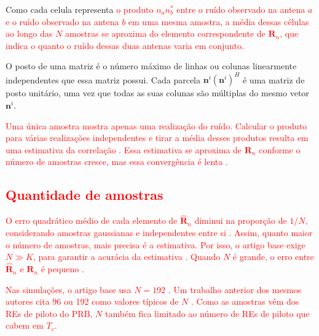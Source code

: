 Como cada celula representa
\textcolor{red}{o produto $n_a n_b^*$ entre o ruído observado na antena $a$ e o ruído observado na antena $b$ em uma mesma amostra, a média dessas células ao longo das $N$ amostras se aproxima do elemento correspondente de $\mathbf{R}_n$, que indica o quanto o ruído dessas duas antenas varia em conjunto.}

O posto de uma matriz é o número máximo de linhas ou colunas linearmente independentes que essa matriz possui.  Cada parcela $\mathbf{n}^i(\mathbf{n}^i)^H$ é uma matriz de posto unitário, uma vez que todas as suas colunas são múltiplas do mesmo vetor $\mathbf{n}^i$.

\textcolor{red}{Uma única amostra mostra apenas uma realização do ruído. Calcular o produto para várias realizações independentes e tirar a média desses produtos resulta em uma estimativa da correlação \cite[p.~229]{haykin-sistemas}. Essa estimativa se aproxima de $\mathbf{R}_n$ conforme o número de amostras cresce, mas essa convergência é lenta \cite{tomasin-interference}.}

\subsection{\texorpdfstring{\textcolor{red}{Quantidade de amostras}}{Quantidade de amostras}}

\textcolor{red}{O erro quadrático médio de cada elemento de $\hat{\mathbf{R}}_n$ diminui na proporção de $1/N$, considerando amostras gaussianas e independentes entre si \cite{tomasin-interference}. Assim, quanto maior o número de amostras, mais precisa é a estimativa. Por isso, o artigo base exige $N \gg K$, para garantir a acurácia da estimativa \cite{zhao2025jsac}. Quando $N$ é grande, o erro entre $\hat{\mathbf{R}}_n$ e $\mathbf{R}_n$ é pequeno \cite{zhao2025jsac}.}

\textcolor{red}{Nas simulações, o artigo base usa $N = 192$ \cite{zhao2025jsac}. Um trabalho anterior dos mesmos autores cita 96 ou 192 como valores típicos de $N$ \cite{zhao2021-globecom}. Como as amostras vêm dos REs de piloto do PRB, $N$ também fica limitado ao número de REs de piloto que cabem em $T_c$.}

